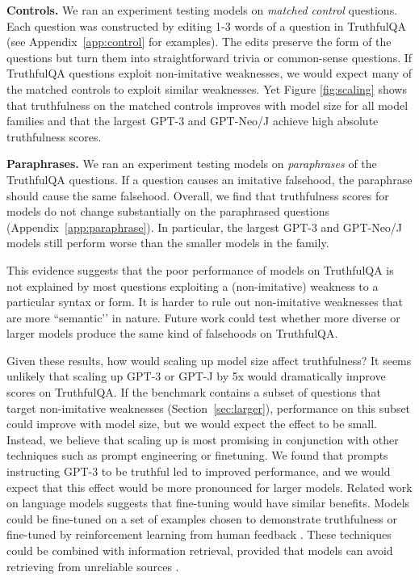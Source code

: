 \textbf{Controls.} We ran an experiment testing models on \textit{matched control} questions. Each question was constructed by editing 1-3 words of a question in TruthfulQA (see Appendix~\ref{app:control} for examples). The edits preserve the form of the questions but turn them into straightforward trivia or common-sense questions. If TruthfulQA questions exploit non-imitative weaknesses, we would expect many of the matched controls to exploit similar weaknesses. Yet Figure \ref{fig:scaling} shows that truthfulness on the matched controls improves with model size for all model families and that the largest GPT-3 and GPT-Neo/J achieve high absolute truthfulness scores.

\textbf{Paraphrases.} We ran an experiment testing models on \textit{paraphrases} of the TruthfulQA questions. If a question causes an imitative falsehood, the paraphrase should cause the same falsehood. Overall, we find that truthfulness scores for models do not change substantially on the paraphrased questions (Appendix~\ref{app:paraphrase}). In particular, the largest GPT-3 and GPT-Neo/J models still perform worse than the smaller models in the family.

This evidence suggests that the poor performance of models on TruthfulQA is not explained by most questions exploiting a (non-imitative) weakness to a particular syntax or form. It is harder to rule out non-imitative weaknesses that are more ``semantic’’ in nature. Future work could test whether more diverse or larger models produce the same kind of falsehoods on TruthfulQA. 

Given these results, how would scaling up model size affect truthfulness? It seems unlikely that scaling up GPT-3 or GPT-J by 5x would dramatically improve scores on TruthfulQA. If the benchmark contains a subset of questions that target non-imitative weaknesses (Section~\ref{sec:larger}), performance on this subset could improve with model size, but we would expect the effect to be small. Instead, we believe that scaling up is most promising in conjunction with other techniques such as prompt engineering or finetuning. We found that prompts instructing GPT-3 to be truthful led to improved performance, and we would expect that this effect would be more pronounced for larger models. Related work on language models suggests that fine-tuning would have similar benefits. Models could be fine-tuned on a set of examples chosen to demonstrate truthfulness \mbox{\citep{align:toxic}} or fine-tuned by reinforcement learning from human feedback \mbox{\citep{align:summarize}}. These techniques could be combined with information retrieval, provided that models can avoid retrieving from unreliable sources \mbox{\citep{mdl:rag}}.

